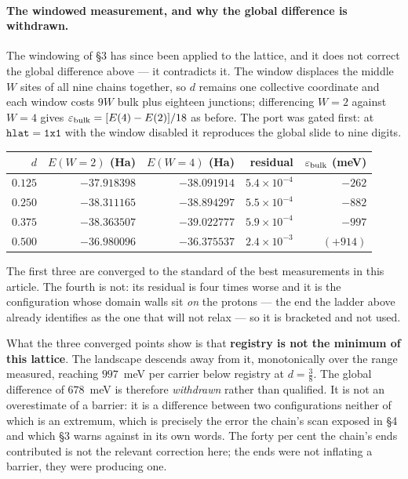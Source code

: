 \documentclass[11pt]{article}
\begin{document}
\paragraph{The windowed measurement, and why the global difference is withdrawn.} The windowing of
\S3 has since been applied to the lattice, and it does not correct the global difference above --- it
contradicts it. The window displaces the middle $W$ sites of all nine chains together, so $d$ remains
one collective coordinate and each window costs $9W$ bulk plus eighteen junctions; differencing $W=2$
against $W=4$ gives $\varepsilon_{\rm bulk}=[E(4)-E(2)]/18$ as before. The port was gated first: at
$\mathtt{hlat=1x1}$ with the window disabled it reproduces the global slide to nine digits.
\begin{center}
\small
\begin{tabular}{@{}rrrrr@{}}
\toprule
$d$ & $E(W{=}2)$ (Ha) & $E(W{=}4)$ (Ha) & residual & $\varepsilon_{\rm bulk}$ (meV)\\
\midrule
$0.125$ & $-37.918398$ & $-38.091914$ & $5.4\times10^{-4}$ & $-262$\\
$0.250$ & $-38.311165$ & $-38.894297$ & $5.5\times10^{-4}$ & $-882$\\
$0.375$ & $-38.363507$ & $-39.022777$ & $5.9\times10^{-4}$ & $-997$\\
$0.500$ & $-36.980096$ & $-36.375537$ & $2.4\times10^{-3}$ & $(+914)$\\
\bottomrule
\end{tabular}
\end{center}
\noindent The first three are converged to the standard of the best measurements in this article.
The fourth is not: its residual is four times worse and it is the configuration whose domain walls
sit \emph{on} the protons --- the end the ladder above already identifies as the one that will not
relax --- so it is bracketed and not used.

What the three converged points show is that \textbf{registry is not the minimum of this lattice}.
The landscape descends away from it, monotonically over the range measured, reaching $997$~meV per
carrier below registry at $d=\tfrac38$. The global difference of $678$~meV is therefore
\emph{withdrawn} rather than qualified. It is not an overestimate of a barrier: it is a difference
between two configurations neither of which is an extremum, which is precisely the error the chain's
scan exposed in \S4 and which \S3 warns against in its own words. The forty per cent the chain's
ends contributed is not the relevant correction here; the ends were not inflating a barrier, they
were producing one.
\end{document}
